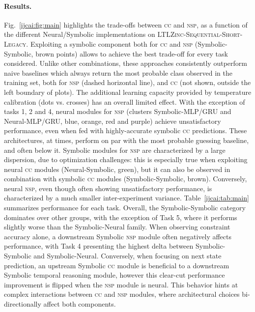 \paragraph{Results.}
%
Fig.~\ref{ijcai:fig:main} highlights the trade-offs between \textsc{cc} and \textsc{nsp}, as a function of the different Neural/Symbolic implementations on \textsc{LTLZinc-Sequential-Short-Legacy}.
%
Exploiting a symbolic component both for \textsc{cc} and \textsc{nsp} (Symbolic-Symbolic, brown points) allows to achieve the best trade-off for every task considered. Unlike other combinations, these approaches consistently outperform naive baselines which always return the most probable class observed in the training set, both for \textsc{nsp} (dashed horizontal line), and \textsc{cc} (not shown, outside the left boundary of plots).
%
The additional learning capacity provided by temperature calibration (dots vs. crosses) has an overall limited effect.
%
With the exception of tasks 1, 2 and 4, neural modules for \textsc{nsp} (clusters Symbolic-MLP/GRU and Neural-MLP/GRU, blue, orange, red and purple) achieve unsatisfactory performance, even when fed with highly-accurate symbolic \textsc{cc} predictions. These architectures, at times, perform on par with the most probable guessing baseline, and often below it.
%
Symbolic modules for \textsc{nsp} are characterized by a large dispersion, due to optimization challenges: this is especially true when exploiting neural \textsc{cc} modules (Neural-Symbolic, green), but it can also be observed in combination with symbolic \textsc{cc} modules (Symbolic-Symbolic, brown). Conversely, neural \textsc{nsp}, even though often showing unsatisfactory performance, is characterized by a much smaller inter-experiment variance.
%
%
%
Table~\ref{ijcai:tab:main} summarizes performance for each task. %
%
Overall, the Symbolic-Symbolic category dominates over other groups, with the exception of Task 5, where it performs slightly worse than the Symbolic-Neural family. When observing constraint accuracy alone, a downstream Symbolic \textsc{nsp} module often negatively affects performance, with Task 4 presenting the highest delta between Symbolic-Symbolic and Symbolic-Neural.
Conversely, when focusing on next state prediction, an upstream Symbolic \textsc{cc} module is beneficial to a downstream Symbolic temporal reasoning module, however this clear-cut performance improvement is flipped when the \textsc{nsp} module is neural. This behavior hints at complex interactions between \textsc{cc} and \textsc{nsp} modules, where architectural choices bi-directionally affect both components.
